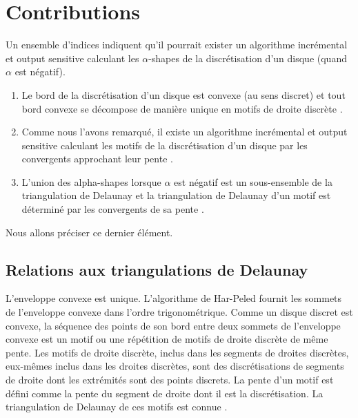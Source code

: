 \section{Contributions}

Un ensemble d'indices indiquent qu'il pourrait exister 
un algorithme incrémental et output sensitive calculant 
les $\alpha$-shapes de la discrétisation d'un disque
(quand $\alpha$ est négatif). 

\begin{enumerate}
\item Le bord de la discrétisation d'un disque est convexe 
(au sens discret) et tout bord convexe se décompose de manière 
unique en motifs de droite discrète \cite{roussillonPR2011}. 
\item Comme nous l'avons remarqué, il existe un algorithme incrémental et output sensitive 
calculant les motifs de la discrétisation d'un disque par les 
convergents approchant leur pente \cite{HarPeled98}. 
\item L'union des alpha-shapes lorsque $\alpha$ est négatif 
est un sous-ensemble de la triangulation de Delaunay \cite{EdeKirSei83}
et la triangulation de Delaunay d'un motif est déterminé par 
les convergents de sa pente \cite{RoussillonL11}. 
\end{enumerate}

Nous allons préciser ce dernier élément. 

\subsection{Relations aux triangulations de Delaunay}


L'enveloppe convexe est unique. L'algorithme de Har-Peled fournit les sommets de l'enveloppe convexe dans l'ordre trigonométrique. Comme un disque discret est convexe, la séquence des points de son bord entre deux sommets de l'enveloppe convexe est un motif ou une répétition de motifs de droite discrète de même pente. Les motifs de droite discrète, inclus dans les segments de droites discrètes, eux-mêmes inclus dans les droites discrètes, sont des discrétisations de segments de droite dont les extrémités sont des points discrets. La pente d'un motif est défini comme la pente du segment de droite dont il est la discrétisation. La triangulation de Delaunay de ces motifs est connue \cite{RoussillonL11}.\\

